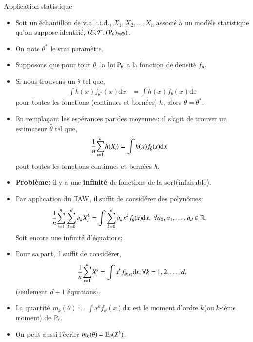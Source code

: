 \begin{frame}
    [allowframebreaks]{Application statistique}
    \begin{itemize}
        \item Soit un échantillon de v.a. i.i.d., $X_1, X_2, \ldots, X_n$ associé à un modèle statistique qu'on suppose identifié,
        $\left(\mathcal{E}, \mathcal{F}, (\operatorname{P}_\theta)_{\theta\in \Theta}\right)$.
        \item On note $\theta^*$ le vrai paramètre.
        \item Supposons que pour tout $\theta$, la loi $\operatorname{P}_\theta$ a la fonction  de densité $f_\theta$.
        \item Si nous trouvons un $\theta$ tel que,
        \begin{align*}
            \int h(x)f_{\theta^*}(x)\mathrm{d}x &=\int h(x)f_{\theta}(x)\mathrm{d}x
        \end{align*}
        pour toutes les fonctions (continues et bornées) $h$, alors $\theta = \theta^*$.
        \item En remplaçant les espérances par des moyennes: il s'agit de trouver un estimateur $\hat{\theta}$ tel que, 
        \begin{align*}
            \frac{1}{n}{\sum_{i=1}^n} h(X_i) &=\int h(x)f_{\hat{\theta}}(x)\mathrm{d}x
        \end{align*}
        pout toutes les fonctions continues et bornées $h$.
        \item \textbf{Problème:} il y a une \textbf{infinité} de fonctions de la sort(infaisable).
        
        \framebreak

        \item Par application du TAW, il suffit de considérer des polynômes: 
        \begin{align*}
            \frac{1}{n}{\sum_{i=1}^n}\sum_{k=0}^d a_k X_i^k &= \int \sum_{k=0}^d a_kx^kf_{\hat{\theta}}(x)\mathrm{d}x, \ \forall a_0, a_1, \ldots, a_d\in \mathbb{R}.
        \end{align*}
        Soit encore une infinité d'équations: 
        \item Pour sa part, il suffit de considérer,
        \begin{align*}
            \frac{1}{n}{\sum_{i=1}^n} X_i^k = \int x^k f_{\hat{\theta}(x)}\mathrm{d}x, \forall k=1, 2, \ldots, d,
        \end{align*}
        (seulement $d+1$ équations).
        \item La quantité $m_k(\theta):= \int x^kf_\theta(x)\mathrm{d}x$ est le moment d'ordre $k$(ou $k$-ième moment) de $\operatorname{P}_\theta$.
        \item On peut aussi l'écrire $m_k(\theta)=\operatorname{E}_\theta(X^k)$. 
    \end{itemize}
\end{frame}
